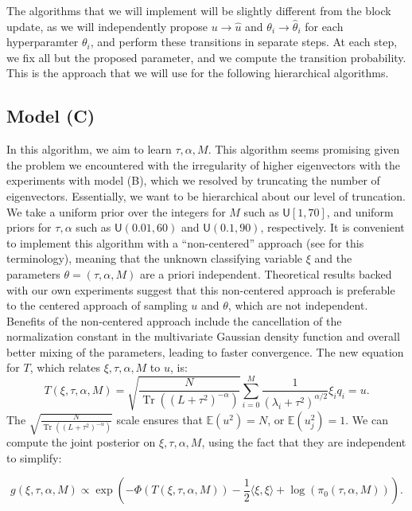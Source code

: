 \documentclass{siamart1116}
\DeclareMathOperator{\Tr}{Tr}
\begin{document}
        The algorithms that we will implement will be slightly different from the block update, as we will independently propose $u \to \hat u$ and $\theta_i \to \hat \theta_i$ for each hyperparamter $\theta_i$, and perform these transitions in separate steps. At each step, we fix all but the proposed parameter, and we compute the transition probability. This is the approach that we will use for the following hierarchical algorithms.

    \subsection{Model (C)}
        In this algorithm, we aim to learn $\tau, \alpha, M$. This algorithm seems promising given the problem we encountered with the irregularity of higher eigenvectors with the experiments with model (B), which we resolved by truncating the number of eigenvectors. Essentially, we want to be hierarchical about our level of truncation. We take a uniform prior over the integers for $M$ such as $\mathsf{U}[1,70]$, and uniform priors for $\tau, \alpha$ such as $\mathsf{U}(0.01,60)$ and $\mathsf{U}(0.1,90)$, respectively. It is convenient to implement this algorithm with a ``non-centered'' approach (see \cite{Noncentered} for this terminology), meaning that the unknown classifying variable $\xi$ and the parameters $\theta=(\tau,\alpha, M)$ are a priori independent. Theoretical results backed with our own experiments suggest that this non-centered approach is preferable to the centered approach of sampling $u$ and $\theta$, which are not independent. Benefits of the non-centered approach include the cancellation of the normalization constant in the multivariate Gaussian density function and overall better mixing of the parameters, leading to faster convergence. The new equation for $T$, which relates $\xi, \tau, \alpha, M$ to $u$, is:
        \begin{equation}
            \label{eqn:noncentered_T_M}
            T(\xi,\tau,\alpha, M) = \sqrt{\frac{N}{\Tr ((L + \tau^2)^{-\alpha}) }} \sum_{i=0}^M \frac{1}{(\lambda_i+\tau^2)^{\alpha/2}}\xi_iq_i = u.
        \end{equation}
        The $\sqrt{\frac{N}{\Tr ((L + \tau^2)^{-\alpha}) }}$ scale ensures that $\mathbb{E}(u^2) = N$, or $\mathbb{E}(u_j^2) = 1$. We can compute the joint posterior on $\xi, \tau, \alpha, M$, using the fact that they are independent to simplify:

        \begin{equation}
        \label{eqn:noncentered_post_M}
        g(\xi,\tau,\alpha, M) \propto \exp\left( -\Phi(T(\xi,\tau,\alpha,M))-\frac{1}{2}\langle \xi,\xi \rangle + \log(\pi_0(\tau,\alpha,M)) \right).
        \end{equation}
\end{document}
